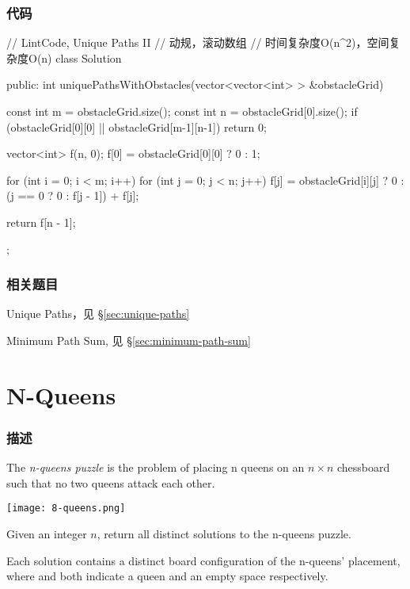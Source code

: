 \subsubsection{代码}
\begin{Code}
// LintCode, Unique Paths II
// 动规，滚动数组
// 时间复杂度O(n^2)，空间复杂度O(n)
class Solution {
public:
    int uniquePathsWithObstacles(vector<vector<int> > &obstacleGrid) {
        const int m = obstacleGrid.size();
        const int n = obstacleGrid[0].size();
        if (obstacleGrid[0][0] || obstacleGrid[m-1][n-1]) return 0;

        vector<int> f(n, 0);
        f[0] = obstacleGrid[0][0] ? 0 : 1;

        for (int i = 0; i < m; i++)
            for (int j = 0; j < n; j++)
                f[j] = obstacleGrid[i][j] ? 0 : (j == 0 ? 0 : f[j - 1]) + f[j];

        return f[n - 1];
    }
};
\end{Code}


\subsubsection{相关题目}
\begindot
\item Unique Paths，见 \S \ref{sec:unique-paths}
\item Minimum Path Sum, 见 \S \ref{sec:minimum-path-sum}
\myenddot


\section{N-Queens} %
\label{sec:n-queens}


\subsubsection{描述}
The \emph{n-queens puzzle} is the problem of placing n queens on an $n \times n$ chessboard such that no two queens attack each other.

\begin{center}
\texttt{[image: 8-queens.png]}\\
\label{fig:8-queens}
\end{center}

Given an integer $n$, return all distinct solutions to the n-queens puzzle.

Each solution contains a distinct board configuration of the n-queens' placement, where  and  both indicate a queen and an empty space respectively.

